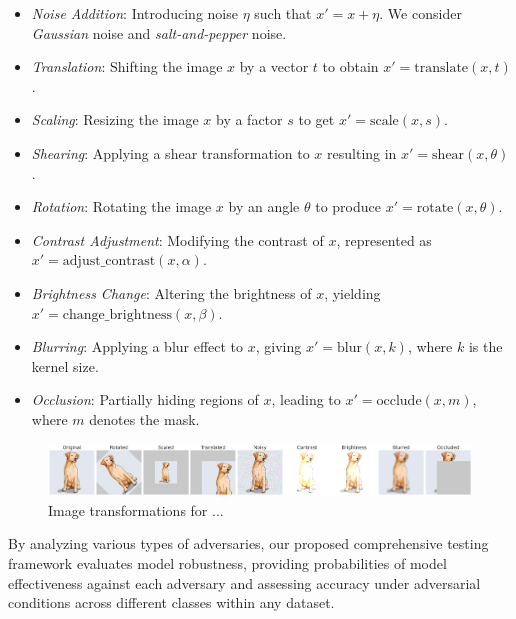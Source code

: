\begin{itemize}
    \item \emph{Noise Addition}: Introducing noise $\eta$ such that $x' = x + \eta$. We consider \emph{Gaussian} noise and \emph{salt-and-pepper} noise.
    \item \emph{Translation}: Shifting the image $x$ by a vector $t$ to obtain $x' = \text{translate}(x, t)$.
    \item \emph{Scaling}: Resizing the image $x$ by a factor $s$ to get $x' = \text{scale}(x, s)$.
    \item \emph{Shearing}: Applying a shear transformation to $x$ resulting in $x' = \text{shear}(x, \theta)$.
    \item \emph{Rotation}: Rotating the image $x$ by an angle $\theta$ to produce $x' = \text{rotate}(x, \theta)$.
    \item \emph{Contrast Adjustment}: Modifying the contrast of $x$, represented as $x' = \text{adjust\_contrast}(x, \alpha)$.
    \item \emph{Brightness Change}: Altering the brightness of $x$, yielding $x' = \text{change\_brightness}(x, \beta)$.
    \item \emph{Blurring}: Applying a blur effect to $x$, giving $x' = \text{blur}(x, k)$, where $k$ is the kernel size.
    \item \emph{Occlusion}: Partially hiding regions of $x$, leading to $x' = \text{occlude}(x, m)$, where $m$ denotes the mask.
\end{itemize}

\begin{figure}
    \centering
    \includegraphics[width=\linewidth]{figures/output_update.png}
    \caption{Image transformations for ...}
    \label{fig:image-trans}
\end{figure}

By analyzing various types of adversaries, our proposed comprehensive testing framework evaluates model robustness, providing probabilities of model effectiveness against each adversary and assessing accuracy under adversarial conditions across different classes within any dataset.



